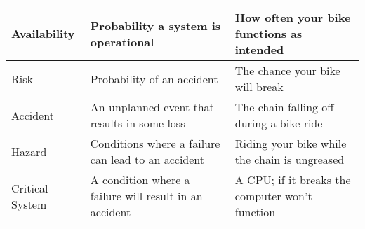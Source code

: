 \begin{tabularx}{\textwidth}{|l|X|X|}
    Availability    & Probability a system is operational                                 & How often your bike functions as intended                                         \\ \hline
    Risk            & Probability of an accident                                          & The chance your bike will break                                                   \\ \hline
    Accident        & An unplanned event that results in some loss                        & The chain falling off during a bike ride                                          \\ \hline
    Hazard          & Conditions where a failure can lead to an accident                  & Riding your bike while the chain is ungreased                                     \\ \hline
    Critical System & A condition where a failure will result in an accident              & A CPU; if it breaks the computer won't function                                   \\ \hline
\end{tabularx}

\newpage
{}


